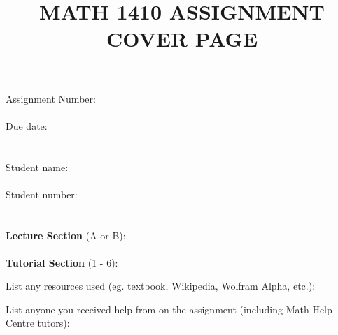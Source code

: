 \documentclass[12pt,letterpaper]{article}
\title{MATH 1410 ASSIGNMENT COVER PAGE}
\date{}
\begin{document}
\maketitle
\large
\begin{tabbing}
Assignment Number: \= \underline{\hspace{1in}}  \=\\
\\
Due date: \> \underline{\hspace{4in}}\\
\\
\\
Student name: \> \underline{\hspace{4in}}\\
\\
Student number: \> \underline{\hspace{4in}}\\
\\
\\
\textbf{Lecture Section} (A or B):\> \> \underline{\hspace{1in}}\\
\\
\textbf{Tutorial Section} (1 - 6): \> \> \underline{\hspace{1in}}
\end{tabbing}




\vspace{0.3in}

\noindent List any resources used (eg. textbook, Wikipedia, Wolfram Alpha, etc.):

\vspace{1.25in}

\noindent List anyone you received help from on the assignment (including Math Help Centre tutors):
\end{document}
